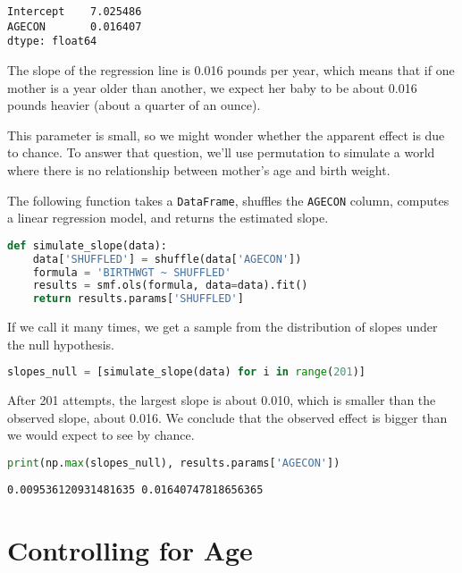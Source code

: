 \begin{lstlisting}[style=output]
Intercept    7.025486
AGECON       0.016407
dtype: float64
\end{lstlisting}

The slope of the regression line is 0.016 pounds per year, which means
that if one mother is a year older than another, we expect her baby to
be about 0.016 pounds heavier (about a quarter of an ounce).

This parameter is small, so we might wonder whether the apparent effect
is due to chance. To answer that question, we'll use permutation to
simulate a world where there is no relationship between mother's age and
birth weight.

The following function takes a \passthrough{\lstinline!DataFrame!},
shuffles the \passthrough{\lstinline!AGECON!} column, computes a linear
regression model, and returns the estimated slope.

\begin{lstlisting}[language=Python,style=source]
def simulate_slope(data):
    data['SHUFFLED'] = shuffle(data['AGECON'])
    formula = 'BIRTHWGT ~ SHUFFLED'
    results = smf.ols(formula, data=data).fit()
    return results.params['SHUFFLED']
\end{lstlisting}

If we call it many times, we get a sample from the distribution of
slopes under the null hypothesis.

\begin{lstlisting}[language=Python,style=source]
slopes_null = [simulate_slope(data) for i in range(201)]
\end{lstlisting}

After 201 attempts, the largest slope is about 0.010, which is smaller
than the observed slope, about 0.016. We conclude that the observed
effect is bigger than we would expect to see by chance.

\begin{lstlisting}[language=Python,style=source]
print(np.max(slopes_null), results.params['AGECON'])
\end{lstlisting}

\begin{lstlisting}[style=output]
0.009536120931481635 0.01640747818656365
\end{lstlisting}

\section{Controlling for Age}\label{controlling-for-age}

